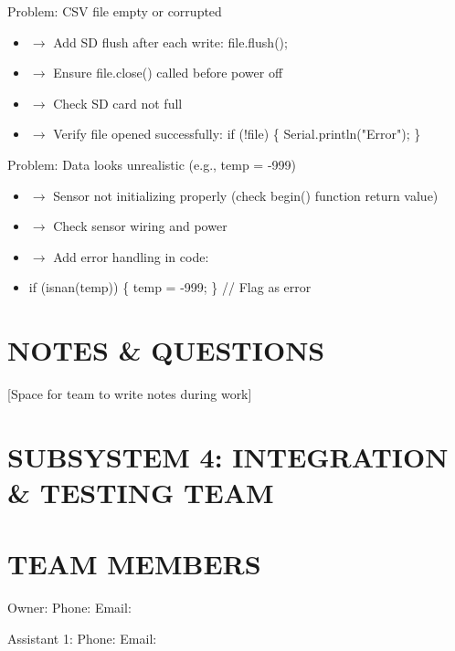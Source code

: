 \documentclass[11pt,letterpaper]{article}
\begin{document}
Problem: CSV file empty or corrupted\par

\begin{itemize}
  \item $\rightarrow$ Add SD flush after each write: file.flush();
  \item $\rightarrow$ Ensure file.close() called before power off
  \item $\rightarrow$ Check SD card not full
  \item $\rightarrow$ Verify file opened successfully: if (!file) \{ Serial.println("Error"); \}
\end{itemize}

Problem: Data looks unrealistic (e.g., temp = -999)\par

\begin{itemize}
  \item $\rightarrow$ Sensor not initializing properly (check begin() function return value)
  \item $\rightarrow$ Check sensor wiring and power
  \item $\rightarrow$ Add error handling in code:
  \item if (isnan(temp)) \{ temp = -999; \} // Flag as error
\end{itemize}

\section{NOTES \& QUESTIONS}

[Space for team to write notes during work]\par

\section{SUBSYSTEM 4: INTEGRATION \& TESTING TEAM}

\section{TEAM MEMBERS}

Owner:         \underline{\hspace{4.8cm}}  Phone: \underline{\hspace{1.7999999999999998cm}}  Email: \underline{\hspace{1.95cm}}\par

Assistant 1:   \underline{\hspace{4.8cm}}  Phone: \underline{\hspace{1.7999999999999998cm}}  Email: \underline{\hspace{1.95cm}}\par
\end{document}
